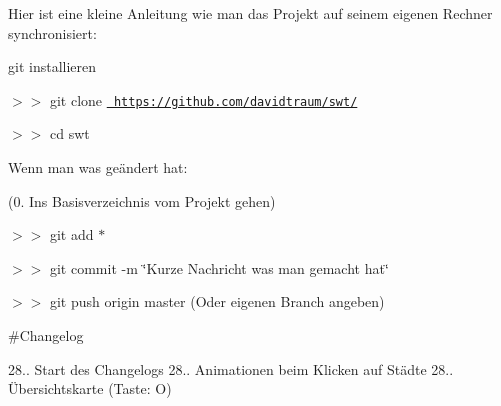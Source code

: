 Hier ist eine kleine Anleitung wie man das Projekt auf seinem eigenen Rechner synchronisiert\+:


\begin{DoxyEnumerate}
\item git installieren
\item $>$$>$ git clone \href{https://github.com/davidtraum/swt/}{\texttt{ https\+://github.\+com/davidtraum/swt/}}
\item $>$$>$ cd swt
\end{DoxyEnumerate}

Wenn man was geändert hat\+:

(0. Ins Basisverzeichnis vom Projekt gehen)
\begin{DoxyEnumerate}
\item $>$$>$ git add $\ast$
\end{DoxyEnumerate}
\begin{DoxyEnumerate}
\item $>$$>$ git commit -\/m \char`\"{}\+Kurze Nachricht was man gemacht hat\char`\"{}
\item $>$$>$ git push origin master (Oder eigenen Branch angeben)
\end{DoxyEnumerate}

\#\+Changelog

28.. Start des Changelogs 28.. Animationen beim Klicken auf Städte 28.. Übersichtskarte (Taste\+: O) 